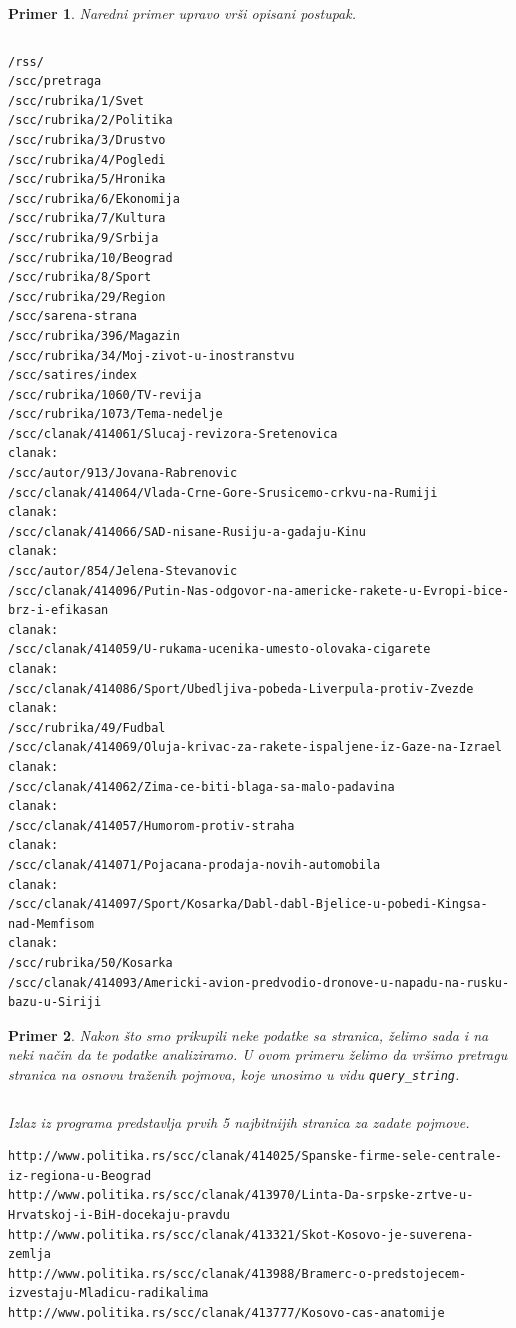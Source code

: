 \documentclass[a4paper]{article}
\newtheorem{primer}{Primer}[section]
\begin{document}
\begin{primer}
Naredni primer upravo vrši opisani postupak.


\inputminted{python}{Codes/2/1-scraper.py}

\begin{lstlisting}
/rss/
/scc/pretraga
/scc/rubrika/1/Svet
/scc/rubrika/2/Politika
/scc/rubrika/3/Drustvo
/scc/rubrika/4/Pogledi
/scc/rubrika/5/Hronika
/scc/rubrika/6/Ekonomija
/scc/rubrika/7/Kultura
/scc/rubrika/9/Srbija
/scc/rubrika/10/Beograd
/scc/rubrika/8/Sport
/scc/rubrika/29/Region
/scc/sarena-strana
/scc/rubrika/396/Magazin
/scc/rubrika/34/Moj-zivot-u-inostranstvu
/scc/satires/index
/scc/rubrika/1060/TV-revija
/scc/rubrika/1073/Tema-nedelje
/scc/clanak/414061/Slucaj-revizora-Sretenovica
clanak:
/scc/autor/913/Jovana-Rabrenovic
/scc/clanak/414064/Vlada-Crne-Gore-Srusicemo-crkvu-na-Rumiji
clanak:
/scc/clanak/414066/SAD-nisane-Rusiju-a-gadaju-Kinu
clanak:
/scc/autor/854/Jelena-Stevanovic
/scc/clanak/414096/Putin-Nas-odgovor-na-americke-rakete-u-Evropi-bice-brz-i-efikasan
clanak:
/scc/clanak/414059/U-rukama-ucenika-umesto-olovaka-cigarete
clanak:
/scc/clanak/414086/Sport/Ubedljiva-pobeda-Liverpula-protiv-Zvezde
clanak:
/scc/rubrika/49/Fudbal
/scc/clanak/414069/Oluja-krivac-za-rakete-ispaljene-iz-Gaze-na-Izrael
clanak:
/scc/clanak/414062/Zima-ce-biti-blaga-sa-malo-padavina
clanak:
/scc/clanak/414057/Humorom-protiv-straha
clanak:
/scc/clanak/414071/Pojacana-prodaja-novih-automobila
clanak:
/scc/clanak/414097/Sport/Kosarka/Dabl-dabl-Bjelice-u-pobedi-Kingsa-nad-Memfisom
clanak:
/scc/rubrika/50/Kosarka
/scc/clanak/414093/Americki-avion-predvodio-dronove-u-napadu-na-rusku-bazu-u-Siriji
\end{lstlisting}
\end{primer}


\begin{primer}
Nakon što smo prikupili neke podatke sa stranica, želimo sada i na neki način da te podatke analiziramo. U ovom primeru želimo da vršimo pretragu stranica na osnovu traženih pojmova, koje unosimo u vidu \texttt{query\_string}. 
\inputminted{python}{Codes/2/2-analisys.py}

Izlaz iz programa predstavlja prvih 5 najbitnijih stranica za zadate pojmove. 
\begin{lstlisting}
http://www.politika.rs/scc/clanak/414025/Spanske-firme-sele-centrale-iz-regiona-u-Beograd
http://www.politika.rs/scc/clanak/413970/Linta-Da-srpske-zrtve-u-Hrvatskoj-i-BiH-docekaju-pravdu
http://www.politika.rs/scc/clanak/413321/Skot-Kosovo-je-suverena-zemlja
http://www.politika.rs/scc/clanak/413988/Bramerc-o-predstojecem-izvestaju-Mladicu-radikalima
http://www.politika.rs/scc/clanak/413777/Kosovo-cas-anatomije
\end{lstlisting}
\end{primer}
\newpage
\end{document}
